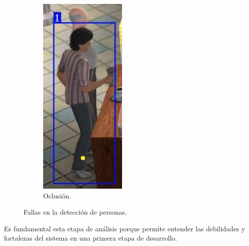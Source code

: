 \begin{figure}[!htpb]
\begin{subfigure}[b]{0.3\textwidth}
         \includegraphics[width=.65\textwidth]{./Figures/fallasDetector3.jpg}
         \caption{Oclusión.}
         \label{fig:fallasDetector3de3}
     \end{subfigure}
        \caption{Fallas en la detección de personas.}
        \label{fig:fallasDetector}
\end{figure}

Es fundamental esta etapa de análisis porque permite entender las debilidades y fortalezas del sistema en una primera etapa de desarrollo.




